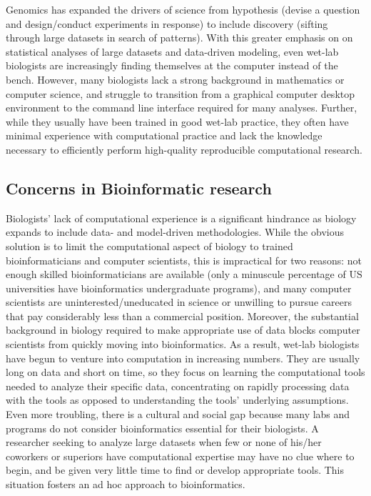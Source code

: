 \documentclass[ChapterTOCs,krantz2]{krantz} %
\begin{document}
Genomics has expanded the drivers of science from hypothesis (devise a question 
and design/conduct experiments in response) to include discovery (sifting through large datasets in search of patterns).  With this greater emphasis on 
on statistical analyses of large datasets and data-driven modeling, even wet-lab biologists are
increasingly finding themselves at the computer instead of the bench\cite{Merali2010}.  
However, many biologists lack a strong background in mathematics or
computer science\cite{Bialek2004,Pevzner2009}, 
and struggle to transition from a graphical
computer desktop environment to the command line interface required for
many analyses.  Further, while they
usually have been trained in good wet-lab practice,
they often have minimal experience with computational 
practice and lack the knowledge necessary to 
efficiently perform high-quality reproducible 
computational research\cite{Merali2010,Segal2007}.

\subsection{Concerns in Bioinformatic research}


Biologists' lack of computational experience is a significant hindrance as
biology expands to include data- and model-driven methodologies.
While the obvious solution is to limit the computational aspect of
biology to trained bioinformaticians and computer scientists,
this is impractical for two reasons:
not enough skilled bioinformaticians are available (only a minuscule percentage
of US universities have bioinformatics undergraduate programs), and many
computer scientists are uninterested/uneducated in science or unwilling to pursue careers
that pay considerably less than a commercial position.  Moreover, the
substantial background in biology required to make appropriate use of
data blocks computer scientists from quickly moving into bioinformatics.
As a result,
wet-lab biologists have begun to venture into computation in increasing
numbers\cite{Heaton2012,Kelly2008}.
They are usually long on data and short on time, so they
focus on learning the computational tools needed to analyze their specific
data, concentrating on rapidly processing data with the tools 
as opposed to understanding the tools' underlying
assumptions.  Even more troubling, there is a cultural and social gap
because many labs and programs do not consider bioinformatics
essential for their biologists\cite{Segal2007}.  A researcher seeking to analyze large datasets 
when few or none of his/her coworkers or superiors have
computational expertise may have no clue where to begin, and be given very little
time to find or develop appropriate tools.  This situation fosters an ad hoc
approach to bioinformatics.    
\end{document}
